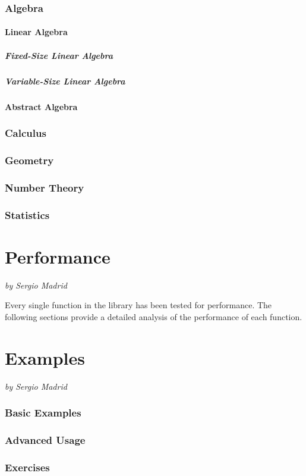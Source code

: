 \documentclass[a4paper,oneside,10pt]{article}
\newcommand{\authoredpart}[2]{
  \clearpage
  \part{#1}
  \vspace{-1em} %
  \Large{\textit{by #2}}
  \vspace{2em} %
}
\theoremstyle{definition}
\begin{document}
\section{Algebra} \label{sec:algebra}

\subsection{Linear Algebra}

\subsubsection{Fixed-Size Linear Algebra}

\subsubsection{Variable-Size Linear Algebra}

\subsection{Abstract Algebra}

\section{Calculus} \label{sec:calculus}

\section{Geometry} \label{sec:geometry}

\section{Number Theory} \label{sec:number_theory}

\section{Statistics} \label{sec:statistics}


\authoredpart{Performance}{Sergio Madrid}

Every single function in the library has been tested for performance. The following sections provide a detailed analysis of the performance of each function.

\authoredpart{Examples}{Sergio Madrid}

\section{Basic Examples}

\section{Advanced Usage}

\section{Exercises}

\end{document}
